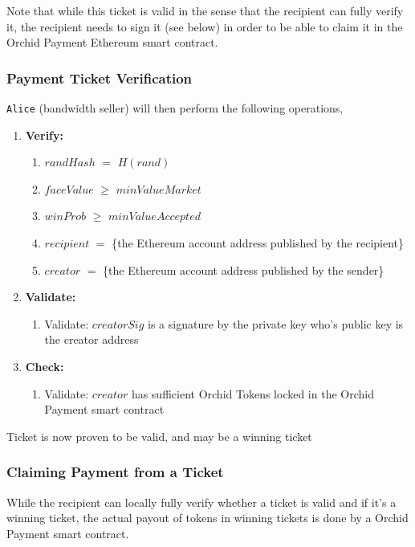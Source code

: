 Note that while this ticket is valid in the sense that the recipient can fully verify it, the recipient needs to sign it (see below) in order to be able to claim it in the Orchid Payment Ethereum smart contract.

\subsubsection{Payment Ticket Verification}
\label{payment-ticket-verif}
\texttt{Alice} (bandwidth seller) will then perform the following operations,
\begin{enumerate}
  \item[] \textbf{Verify:} \begin{enumerate}
  	\item $randHash$ $=$ $H(rand)$
    \item $faceValue$ $\geq$ $minValueMarket$%
    \item $winProb$ $\geq$ $minValueAccepted$%
    \item $recipient$ $=$ \{the Ethereum account address published by the recipient\}
    \item $creator$ $=$ \{the Ethereum account address published by the sender\}
  \end{enumerate}
  \item[] \textbf{Validate:} \begin{enumerate}
  	\item Validate: $creatorSig$ is a signature by the private key who's public key is the creator address
  \end{enumerate}
  \item[] \textbf{Check:} \begin{enumerate}
  	\item Validate: $creator$ has sufficient Orchid Tokens locked in the Orchid Payment smart contract
  \end{enumerate}
\end{enumerate}
Ticket is now proven to be valid, and may be a winning ticket\\

\subsubsection{Claiming Payment from a Ticket}

While the recipient can locally fully verify whether a ticket is valid and if it's a winning ticket, the actual payout of tokens in winning tickets is done by a Orchid Payment smart contract.\\

